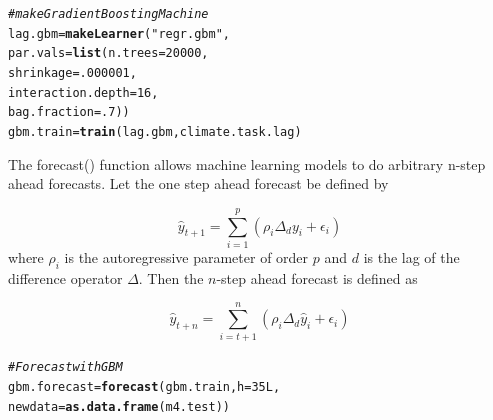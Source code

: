 \documentclass[12pt]{article}\usepackage[]{graphicx}\usepackage[]{color}
\makeatletter
\newcommand{\hlnum}[1]{\textcolor[rgb]{0.686,0.059,0.569}{#1}}%
\newcommand{\hlstr}[1]{\textcolor[rgb]{0.192,0.494,0.8}{#1}}%
\newcommand{\hlcom}[1]{\textcolor[rgb]{0.678,0.584,0.686}{\textit{#1}}}%
\newcommand{\hlstd}[1]{\textcolor[rgb]{0.345,0.345,0.345}{#1}}%
\newcommand{\hlkwb}[1]{\textcolor[rgb]{0.69,0.353,0.396}{#1}}%
\newcommand{\hlkwc}[1]{\textcolor[rgb]{0.333,0.667,0.333}{#1}}%
\newcommand{\hlkwd}[1]{\textcolor[rgb]{0.737,0.353,0.396}{\textbf{#1}}}%
\newenvironment{kframe}{%
 \def\at@end@of@kframe{}%
 \ifinner\ifhmode%
  \def\at@end@of@kframe{\end{minipage}}%
  \begin{minipage}{\columnwidth}%
 \fi\fi%
 \def\FrameCommand##1{\hskip\@totalleftmargin \hskip-\fboxsep
 \colorbox{shadecolor}{##1}\hskip-\fboxsep
     \hskip-\linewidth \hskip-\@totalleftmargin \hskip\columnwidth}%
 \MakeFramed {\advance\hsize-\width
   \@totalleftmargin\z@ \linewidth\hsize
   \@setminipage}}%
 {\par\unskip\endMakeFramed%
 \at@end@of@kframe}
\newenvironment{knitrout}{}{} %
\theoremstyle{definition}
\newcommand\code{\@codex}
\def\@codex#1{{\normalfont\ttfamily\hyphenchar\font=-1 #1}}
\makeatother
\begin{document}
\singlespacing
\begin{knitrout}
\color{fgcolor}\begin{kframe}
\begin{alltt}
\hlcom{# make Gradient Boosting Machine}
\hlstd{lag.gbm} \hlkwb{=} \hlkwd{makeLearner}\hlstd{(}\hlstr{"regr.gbm"}\hlstd{,}
                      \hlkwc{par.vals} \hlstd{=} \hlkwd{list}\hlstd{(}\hlkwc{n.trees} \hlstd{=} \hlnum{20000}\hlstd{,}
                                      \hlkwc{shrinkage} \hlstd{=} \hlnum{.000001}\hlstd{,}
                                      \hlkwc{interaction.depth} \hlstd{=} \hlnum{16}\hlstd{,}
                                      \hlkwc{bag.fraction} \hlstd{=} \hlnum{.7}\hlstd{))}
\hlstd{gbm.train} \hlkwb{=} \hlkwd{train}\hlstd{(lag.gbm, climate.task.lag)}
\end{alltt}
\end{kframe}
\end{knitrout}





\doublespacing

The \code{forecast()} function allows machine learning models to do arbitrary n-step ahead forecasts. Let the one step ahead forecast be defined by

\begin{equation}
\hat{y}_{t+1} = \sum_{i=1}^p \left(\rho_i \Delta_d y_{i} + \epsilon_{i}\right)
\end{equation}
where $\rho_i$ is the autoregressive parameter of order $p$ and $d$ is the lag of the difference operator $\Delta$. Then the $n$-step ahead forecast is defined as

\begin{equation}
\hat{y}_{t+n} = \sum_{i=t+1}^{n} \left(\rho_i \Delta_d \hat{y}_{i} + \epsilon_{i}\right)
\end{equation}


\singlespacing
\begin{knitrout}
\color{fgcolor}\begin{kframe}
\begin{alltt}
\hlcom{# Forecast with GBM}
\hlstd{gbm.forecast} \hlkwb{=} \hlkwd{forecast}\hlstd{(gbm.train,} \hlkwc{h} \hlstd{=} \hlnum{35L}\hlstd{,}
                        \hlkwc{newdata} \hlstd{=} \hlkwd{as.data.frame}\hlstd{(m4.test))}
\end{alltt}
\end{kframe}
\end{knitrout}
\end{document}
